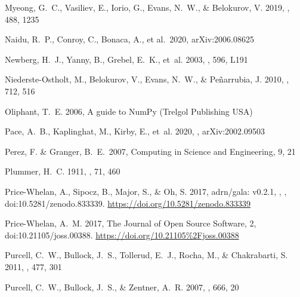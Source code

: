 \documentclass[twocolumn,tighten,twocolappendix]{aastex63}
\begin{document}
\begin{CJK*}{UTF8}{gbsn}
\begin{thebibliography}{}
{Myeong}, G.~C., {Vasiliev}, E., {Iorio}, G., {Evans}, N.~W., \& {Belokurov},
    V. 2019, \mnras, 488, 1235

Naidu, R.~P., Conroy, C., Bonaca, A., et al.\ 2020, arXiv:2006.08625

{Newberg}, H.~J., {Yanny}, B., {Grebel}, E.~K., {et~al.} 2003, \apjl, 596, L191

{Niederste-Ostholt}, M., {Belokurov}, V., {Evans}, N.~W., \& {Pe{\~n}arrubia},
    J. 2010, \apj, 712, 516

{Oliphant}, T.~E. 2006, {A guide to NumPy} (Trelgol Publishing USA)

{Pace}, A.~B., {Kaplinghat}, M., {Kirby}, E., {et~al.} 2020, \mnras,
    arXiv:2002.09503

 Perez, F. \& Granger, B.~E.\ 2007, Computing in Science and Engineering, 9, 21

{Plummer}, H.~C. 1911, \mnras, 71, 460

Price-Whelan, A., Sipocz, B., Major, S., \& Oh, S. 2017, adrn/gala: v0.2.1, , ,
    doi:10.5281/zenodo.833339.
\newblock \url{https://doi.org/10.5281/zenodo.833339}

Price-Whelan, A.~M. 2017, The Journal of Open Source Software, 2,
    doi:10.21105/joss.00388.
\newblock \url{https://doi.org/10.21105\%2Fjoss.00388}

{Purcell}, C.~W., {Bullock}, J.~S., {Tollerud}, E.~J., {Rocha}, M., \&
    {Chakrabarti}, S. 2011, \nat, 477, 301

{Purcell}, C.~W., {Bullock}, J.~S., \& {Zentner}, A.~R. 2007, \apj, 666, 20


\end{thebibliography}
\end{CJK*}
\end{document}
